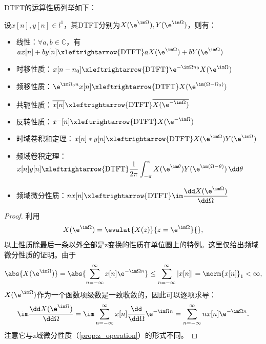 DTFT的运算性质列举如下：
\begin{proposition}[离散时间傅里叶变换的运算性质]
    \label{prop:DTFT_operation}
    设$x[n],y[n]\in l^1$，其DTFT分别为$X(\e^{\im\Omega}),Y(\e^{\im\Omega})$，则有：
    \begin{itemize}
        \item 线性：$\forall a,b\in\mathbb{C}$，有$a x[n]+b y[n]\xleftrightarrow{\mathrm{DTFT}} a X(\e^{\im\Omega})+b Y(\e^{\im\Omega})$
        \item 时移性质：$x[n-n_0]\xleftrightarrow{\mathrm{DTFT}}\e^{-\im\Omega n_0}X(\e^{\im\Omega})$
        \item 频移性质：$\e^{\im\Omega_0 n}x[n]\xleftrightarrow{\mathrm{DTFT}}X(\e^{\im(\Omega-\Omega_0)})$
        \item 共轭性质：$\overline{x[n]}\xleftrightarrow{\mathrm{DTFT}}\overline{X(\e^{-\im\Omega})}$
        \item 反转性质：$x^-[n]\xleftrightarrow{\mathrm{DTFT}}X(\e^{-\im\Omega})$
        \item 时域卷积和定理：$x[n]*y[n]\xleftrightarrow{\mathrm{DTFT}}X(\e^{\im\Omega})Y(\e^{\im\Omega})$
        \item 频域卷积定理：$x[n]y[n]\xleftrightarrow{\mathrm{DTFT}}\displaystyle\frac{1}{2\pi}\int_{-\pi}^{\pi}X(\e^{\im\theta})Y(\e^{\im(\Omega-\theta)})\,\dd\theta$
        \item 频域微分性质：$nx[n]\xleftrightarrow{\mathrm{DTFT}}\im\displaystyle\frac{\dd X(\e^{\im\Omega})}{\dd\Omega}$
    \end{itemize}
\end{proposition}
\begin{proof}
    利用
    \begin{equation}
        X(\e^{\im\Omega})=\evalat{X(z)}{z=\e^{\im\Omega}}{},
    \end{equation}
    以上性质除最后一条以外全部是z变换的性质在单位圆上的特例。这里仅给出频域微分性质的证明。由于
    \begin{equation}
        \abs{X(\e^{\im\Omega})}=\abs{\sum_{n=-\infty}^{\infty}x[n]\e^{-\im\Omega n}}\leq \sum_{n=-\infty}^{\infty}|x[n]|=\norm{x[n]}_1<\infty,
    \end{equation}
    $X(\e^{\im\Omega})$作为一个函数项级数是一致收敛的，因此可以逐项求导：
    \begin{equation}
        \im\frac{\dd X(\e^{\im\Omega})}{\dd\Omega}=\im\sum_{n=-\infty}^{\infty}x[n]\frac{\dd}{\dd\Omega}\e^{-\im\Omega n}=\sum_{n=-\infty}^{\infty}nx[n]\e^{-\im\Omega n}.
    \end{equation}
    注意它与z域微分性质（\cref{prop:z_operation}）的形式不同。
\end{proof}

